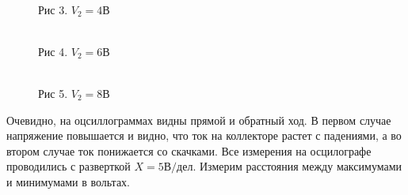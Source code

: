 \documentclass[12pt]{article}
\begin{document}
  \begin {figure}[h!]
    \begin{minipage}[h]{0.33\linewidth}
        \\
        Рис 3. $V_2 = 4 В$
    \end{minipage}
    \begin{minipage}[h]{0.33\linewidth}
        \\
        Рис 4. $V_2 = 6 В$
    \end{minipage}
    \begin{minipage}[h]{0.33\linewidth}
        \\
        Рис 5. $V_2 = 8 В$
    \end{minipage}
    \label {fig:image1}
  \end {figure}

  Очевидно, на оцсиллограммах видны прямой и обратный ход. В первом случае напряжение повышается и видно, что ток
  на коллекторе растет с падениями, а во втором случае ток понижается со скачками. Все измерения на осцилографе
  проводились с разверткой $X = 5 В/дел$. Измерим расстояния между максимумами и минимумами в вольтах.
\end{document}
